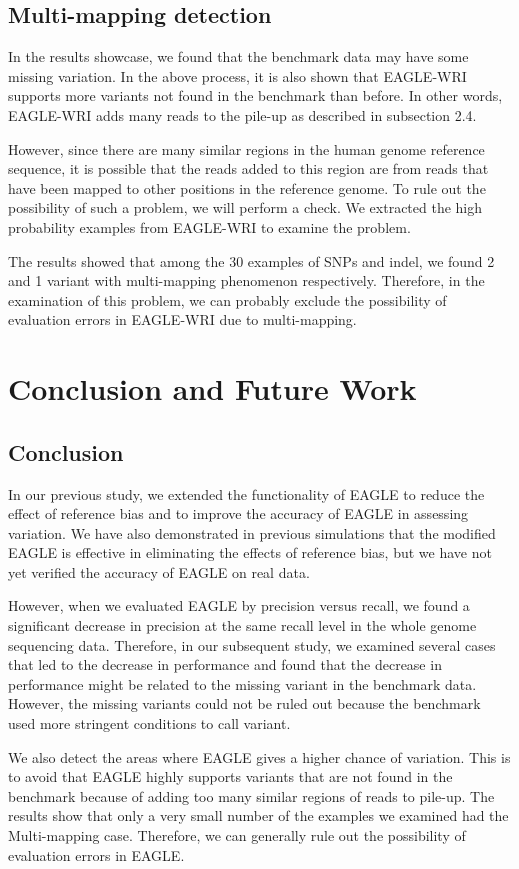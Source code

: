 \documentclass[PhD]{PHlab-thesis}
\begin{document}
\section{Multi-mapping detection}
In the results showcase, we found that the benchmark data may have some missing variation. In the above process, it is also shown that EAGLE-WRI supports more variants not found in the benchmark than before. In other words, EAGLE-WRI adds many reads to the pile-up as described in subsection 2.4.

However, since there are many similar regions in the human genome reference sequence, it is possible that the reads added to this region are from reads that have been mapped to other positions in the reference genome. To rule out the possibility of such a problem, we will perform a check. We extracted the high probability examples from EAGLE-WRI to examine the problem. 

The results showed that among the 30 examples of SNPs and indel, we found 2 and 1 variant with multi-mapping phenomenon respectively. Therefore, in the examination of this problem, we can probably exclude the possibility of evaluation errors in EAGLE-WRI due to multi-mapping.

\chapter{Conclusion and Future Work}
\section{Conclusion}
In our previous study, we extended the functionality of EAGLE to reduce the effect of reference bias and to improve the accuracy of EAGLE in assessing variation. We have also demonstrated in previous simulations that the modified EAGLE is effective in eliminating the effects of reference bias, but we have not yet verified the accuracy of EAGLE on real data.

However, when we evaluated EAGLE by precision versus recall, we found a significant decrease in precision at the same recall level in the whole genome sequencing data. Therefore, in our subsequent study, we examined several cases that led to the decrease in performance and found that the decrease in performance might be related to the missing variant in the benchmark data. However, the missing variants could not be ruled out because the benchmark used more stringent conditions to call variant.

We also detect the areas where EAGLE gives a higher chance of variation. This is to avoid that EAGLE highly supports variants that are not found in the benchmark because of adding too many similar regions of reads to pile-up. The results show that only a very small number of the examples we examined had the Multi-mapping case. Therefore, we can generally rule out the possibility of evaluation errors in EAGLE.
\end{document}
